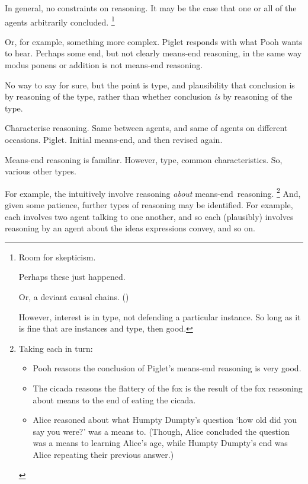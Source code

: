 \begin{note}
  In general, no constraints on reasoning.
  It may be the case that one or all of the agents arbitrarily concluded.%
  \footnote{
    Room for skepticism.

    Perhaps these  just happened.

    Or, a deviant causal chains. (\cite[cf.][79]{Davidson:1973vd})

    However, interest is in type, not defending a particular instance.
    So long as it is fine that are instances and type, then good.
  }

  Or, for example, something more complex.
  Piglet responds with what Pooh wants to hear.
  Perhaps some end, but not clearly means-end reasoning, in the same way modus ponens or addition is not means-end reasoning.

  No way to say for sure, but the point is type, and plausibility that conclusion is by reasoning of the type, rather than whether conclusion \emph{is} by reasoning of the type.

  Characterise reasoning.
  Same between agents, and same of agents on different occasions.
  Piglet.
  Initial means-end, and then revised again.
\end{note}

\begin{note}
  Means-end reasoning is familiar.
  However, type, common characteristics.
  So, various other types.

  For example, the  intuitively involve reasoning \emph{about} means-end~reasoning.%
  \footnote{
    Taking each  in turn:
    \begin{itemize}[noitemsep]
    \item
      Pooh reasons the conclusion of Piglet's means-end reasoning is very good.
    \item
      The cicada reasons the flattery of the fox is the result of the fox reasoning about means to the end of eating the cicada.
    \item
      Alice reasoned about what Humpty Dumpty's question `how old did you say you were?' was a means to.
      (Though, Alice concluded the question was a means to learning Alice's age, while Humpty Dumpty's end was Alice repeating their previous answer.)
    \end{itemize}
  }
  And, given some patience, further types of reasoning may be identified.
  For example, each  involves two agent talking to one another, and so each  (plausibly) involves reasoning by an agent about the ideas expressions convey, and so on.
\end{note}

